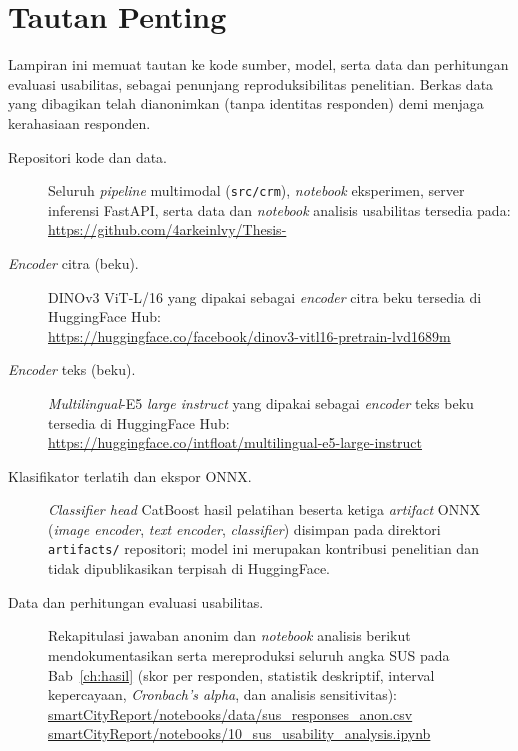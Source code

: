 \chapter{Tautan Penting}
\label{app:tautan}

Lampiran ini memuat tautan ke kode sumber, model, serta data dan perhitungan
evaluasi usabilitas, sebagai penunjang reproduksibilitas penelitian. Berkas data
yang dibagikan telah dianonimkan (tanpa identitas responden) demi menjaga kerahasiaan
responden.

\begin{description}
  \item[Repositori kode dan data.] Seluruh \textit{pipeline} multimodal (\texttt{src/crm}),
  \textit{notebook} eksperimen, server inferensi FastAPI, serta data dan \textit{notebook}
  analisis usabilitas tersedia pada: \\
  \url{https://github.com/4arkeinlvy/Thesis-}

  \item[\textit{Encoder} citra (beku).] DINOv3 ViT-L/16 yang dipakai sebagai
  \textit{encoder} citra beku tersedia di HuggingFace Hub: \\
  \url{https://huggingface.co/facebook/dinov3-vitl16-pretrain-lvd1689m}

  \item[\textit{Encoder} teks (beku).] \textit{Multilingual}-E5 \textit{large instruct} yang dipakai
  sebagai \textit{encoder} teks beku tersedia di HuggingFace Hub: \\
  \url{https://huggingface.co/intfloat/multilingual-e5-large-instruct}

  \item[Klasifikator terlatih dan ekspor ONNX.] \textit{Classifier head} CatBoost hasil
  pelatihan beserta ketiga \textit{artifact} ONNX (\textit{image encoder}, \textit{text
  encoder}, \textit{classifier}) disimpan pada direktori \texttt{artifacts/} repositori;
  model ini merupakan kontribusi penelitian dan tidak dipublikasikan terpisah di HuggingFace.

  \item[Data dan perhitungan evaluasi usabilitas.] Rekapitulasi jawaban anonim dan
  \textit{notebook} analisis berikut mendokumentasikan serta mereproduksi seluruh angka
  SUS pada Bab~\ref{ch:hasil} (skor per responden, statistik deskriptif, interval
  kepercayaan, \textit{Cronbach's alpha}, dan analisis sensitivitas): \\
  \url{smartCityReport/notebooks/data/sus_responses_anon.csv} \\
  \url{smartCityReport/notebooks/10_sus_usability_analysis.ipynb}
\end{description}
